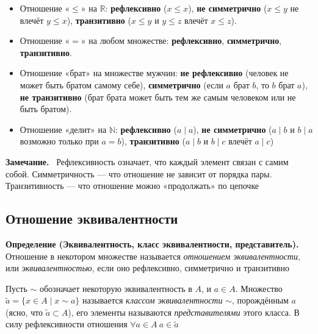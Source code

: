 \documentclass[a4paper,12pt]{article}
\newcommand{\myremark}{\textbf{Замечание.}\ }
\theoremstyle{definition}
\theoremstyle{plain}
\theoremstyle{remark}
\begin{document}
	\begin{tcolorbox}[colback=blue!5, colframe=blue!40!black, title=Примеры свойств]
		\begin{itemize}
			\item Отношение «$\leq$» на $\mathbb{R}$: \textbf{рефлексивно} ($x \leq x$), \textbf{не симметрично} ($x \leq y$ не влечёт $y \leq x$), \textbf{транзитивно} ($x \leq y$ и $y \leq z$ влечёт $x \leq z$).
			\item Отношение «$=$» на любом множестве: \textbf{рефлексивно}, \textbf{симметрично}, \textbf{транзитивно}.
			\item Отношение «брат» на множестве мужчин: \textbf{не рефлексивно} (человек не может быть братом самому себе), \textbf{симметрично} (если $a$ брат $b$, то $b$ брат $a$), \textbf{не транзитивно} (брат брата может быть тем же самым человеком или не быть братом).
			\item Отношение «делит» на $\mathbb{N}$: \textbf{рефлексивно} ($a \mid a$), \textbf{не симметрично} ($a \mid b$ и $b \mid a$ возможно только при $a = b$), \textbf{транзитивно} ($a \mid b$ и $b \mid c$ влечёт $a \mid c$)
		\end{itemize}
	\end{tcolorbox}
	
	\myremark
	Рефлексивность означает, что каждый элемент связан с самим собой. Симметричность — что отношение не зависит от порядка пары. Транзитивность — что отношение можно «продолжать» по цепочке
	
	\subsection{Отношение эквивалентности}
	
	\noindent \textbf{Определение (Эквивалентность, класс эквивалентности, представитель).}
	Отношение в некотором множестве называется \textit{отношением эквивалентности}, или \textit{эквивалентностью}, если оно рефлексивно, симметрично и транзитивно
	
	\medskip
	Пусть $\sim$ обозначает некоторую эквивалентность в $A$, и $a \in A$. Множество $\widetilde{a} = \{x \in A \mid x \sim a\}$ называется \textit{классом эквивалентности} $\sim$, порождённым $a$ (ясно, что $\widetilde{a} \subset A$), его элементы называются \textit{представителями} этого класса. В силу рефлексивности отношения $\forall a \in A \ a \in \widetilde{a}$
	
\end{document}
